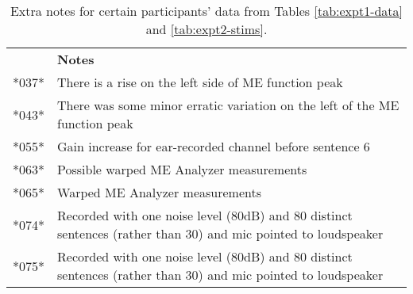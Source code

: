 \begin{table}
\begin{center}
\begin{tabular}{c|p{12cm}}
      & \textbf{Notes} \\
*037* & There is a rise on the left side of ME function peak \\
*043* & There was some minor erratic variation on the left of the ME function peak \\
*055* & Gain increase for ear-recorded channel before sentence 6 \\
*063* & Possible warped ME Analyzer measurements \\
*065* & Warped ME Analyzer measurements \\
*074* & Recorded with one noise level (80dB) and 80 distinct sentences (rather than 30) and mic pointed to loudspeaker \\
*075* & Recorded with one noise level (80dB) and 80 distinct sentences (rather than 30) and mic pointed to loudspeaker \\
\end{tabular}
\caption{Extra notes for certain participants' data from Tables \ref{tab:expt1-data} and \ref{tab:expt2-stims}.}
\end{center}
\end{table}

% 
% 
% 
% 
